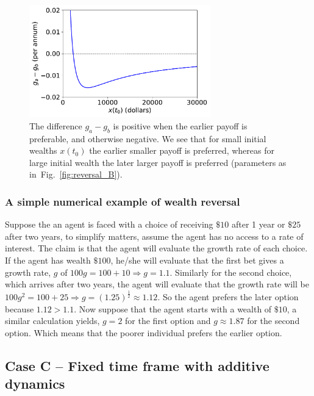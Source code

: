\documentclass[11pt]{article}
\newcommand{\flabel}[1]{\label{fig:#1}}
\newcommand{\fref}[1]{Fig.~\ref{fig:#1}}
\numberwithin{equation}{section}
\begin{document}
\begin{figure}[!htb]
\centering
\includegraphics[width=0.7\textwidth]{./figures/ga_gb.pdf}
\caption{The difference $g_a-g_b$ is positive when the earlier payoff is preferable, and otherwise negative. We see that for small initial wealths $x(t_0)$ the earlier smaller payoff is preferred, whereas for large initial wealth the later larger payoff is preferred (parameters as in~\fref{reversal_B}).}
\flabel{reversal_B2}
\end{figure}

\subsubsection{A simple numerical example of wealth reversal}

Suppose the an agent is faced with a choice of receiving $\$10$ after 1 year or  $\$25$ after two years, to simplify matters, assume the agent has no access to a rate of interest. The claim is that the agent will evaluate the growth rate of each choice. If the agent has wealth $\$100$, he/she will evaluate that the first bet gives a growth rate, $g$ of $100 g = 100+10 \Rightarrow g = 1.1$. Similarly for the second choice, which arrives after two years, the agent will evaluate that the growth rate will be $100 g^2 =100+25 \Rightarrow g = \left(1.25 \right)^{\frac{1}{2}} \approx 1.12$. So the agent prefers the later option because $1.12>1.1$. Now suppose that the agent starts with a wealth of $\$10$, a similar calculation yields, $g=2$ for the first option and $g\approx 1.87$ for the second option. Which means that the poorer individual prefers the earlier option. 

\FloatBarrier
\subsection{Case C -- Fixed time frame with additive dynamics}\label{sec:case_C}
\end{document}
